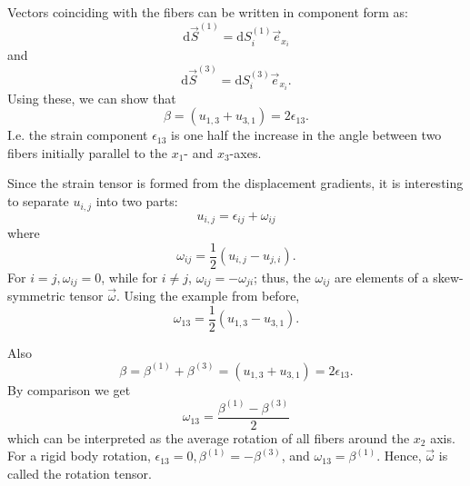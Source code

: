 Vectors coinciding with the fibers can be written in component form as:
\begin{equation*}
  \mathrm{d}\Vec{S}^{(1)} = \mathrm{d}S_i^{(1)} \Vec{e}_{x_i}
\end{equation*}
and
\begin{equation*}
  \mathrm{d}\Vec{S}^{(3)} = \mathrm{d}S_i^{(3)} \Vec{e}_{x_i}
.\end{equation*}
Using these, we can show that
\begin{equation*}
  \beta = (u_{1,3} + u_{3,1}) = 2 \epsilon_{13}
.\end{equation*}
I.e. the strain component $\epsilon_{13}$ is one half the increase in the angle between two fibers initially parallel to the $x_1$- and $x_3$-axes.

Since the strain tensor is formed from the displacement gradients, it is interesting to separate $u_{i,j}$ into two parts:
\begin{equation*}
  u_{i,j} = \epsilon_{ij} + \omega_{ij}
\end{equation*}
where
\begin{equation*}
  \omega_{ij} = \frac{1}{2} \left( u_{i,j} - u_{j,i} \right)
.\end{equation*}
For $i = j, \omega_{ij} = 0$, while for $i \neq j$, $\omega_{ij} = -\omega_{ji}$; thus, the $\omega_{ij}$ are elements of a skew-symmetric tensor $\Vec{\omega}$.
Using the example from before,
\begin{equation*}
  \omega_{13} = \frac{1}{2} \left( u_{1,3} - u_{3,1} \right)
.\end{equation*}

Also
\begin{equation*}
  \beta = \beta^{(1)} + \beta^{(3)} = (u_{1,3} + u_{3,1}) = 2\epsilon_{13}
.\end{equation*}
By comparison we get
\begin{equation*}
  \omega_{13} = \frac{\beta^{(1)} - \beta^{(3)}}{2}
\end{equation*}
which can be interpreted as the average rotation of all fibers around the $x_2$ axis.
For a rigid body rotation, $\epsilon_{13 } = 0, \beta^{(1)} = -\beta^{(3)}$, and $\omega_{13} = \beta^{(1)}$. Hence, $\Vec{\omega}$ is called the rotation tensor.
